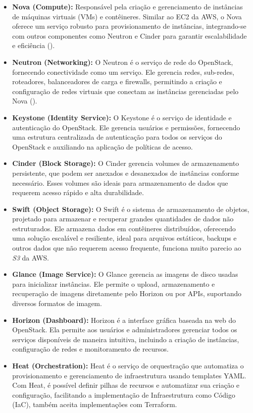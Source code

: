 \begin{itemize}
    \item \textbf{Nova (Compute): } Responsável pela criação e gerenciamento de instâncias de máquinas virtuais (VMs) e contêineres. Similar ao EC2 da AWS, o Nova oferece um serviço robusto para provisionamento de instâncias, integrando-se com outros componentes como Neutron e Cinder para garantir escalabilidade e eficiência (\cite{OpenStackNovaArchitecture}).
    \item \textbf{Neutron (Networking): } O Neutron é o serviço de rede do OpenStack, fornecendo conectividade como um serviço. Ele gerencia redes, sub-redes, roteadores, balanceadores de carga e firewalls, permitindo a criação e configuração de redes virtuais que conectam as instâncias gerenciadas pelo Nova (\cite{OpenStackNeutronArchitecture}).
    \item \textbf{Keystone (Identity Service): } O Keystone é o serviço de identidade e autenticação do OpenStack. Ele gerencia usuários e permissões, fornecendo uma estrutura centralizada de autenticação para todos os serviços do OpenStack e auxiliando na aplicação de políticas de acesso.
    \item \textbf{Cinder (Block Storage): } O Cinder gerencia volumes de armazenamento persistente, que podem ser anexados e desanexados de instâncias conforme necessário. Esses volumes são ideais para armazenamento de dados que requerem acesso rápido e alta durabilidade.
    \item \textbf{Swift (Object Storage): } O Swift é o sistema de armazenamento de objetos, projetado para armazenar e recuperar grandes quantidades de dados não estruturados. Ele armazena dados em contêineres distribuídos, oferecendo uma solução escalável e resiliente, ideal para arquivos estáticos, backups e outros dados que não requerem acesso frequente, funciona muito parecio ao \textit{S3} da AWS.
    \item \textbf{Glance (Image Service): } O Glance gerencia as imagens de disco usadas para inicializar instâncias. Ele permite o upload, armazenamento e recuperação de imagens diretamente pelo Horizon ou por APIs, suportando diversos formatos de imagem.
    \item \textbf{Horizon (Dashboard): } Horizon é a interface gráfica baseada na web do OpenStack. Ela permite aos usuários e administradores gerenciar todos os serviços disponíveis de maneira intuitiva, incluindo a criação de instâncias, configuração de redes e monitoramento de recursos.
    \item \textbf{Heat (Orchestration): } Heat é o serviço de orquestração que automatiza o provisionamento e gerenciamento de infraestrutura usando templates YAML. Com Heat, é possível definir pilhas de recursos e automatizar sua criação e configuração, facilitando a implementação de Infraestrutura como Código (IaC), também aceita implementações com Terraform.

\end{itemize}
